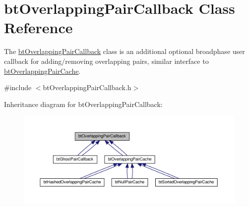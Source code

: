 \hypertarget{classbtOverlappingPairCallback}{}\section{bt\+Overlapping\+Pair\+Callback Class Reference}
\label{classbtOverlappingPairCallback}


The \hyperlink{classbtOverlappingPairCallback}{bt\+Overlapping\+Pair\+Callback} class is an additional optional broadphase user callback for adding/removing overlapping pairs, similar interface to \hyperlink{classbtOverlappingPairCache}{bt\+Overlapping\+Pair\+Cache}.  




{\ttfamily \#include $<$bt\+Overlapping\+Pair\+Callback.\+h$>$}



Inheritance diagram for bt\+Overlapping\+Pair\+Callback\+:
\nopagebreak
\begin{figure}[H]
\begin{center}
\leavevmode
\includegraphics[width=350pt]{classbtOverlappingPairCallback__inherit__graph}
\end{center}
\end{figure}
